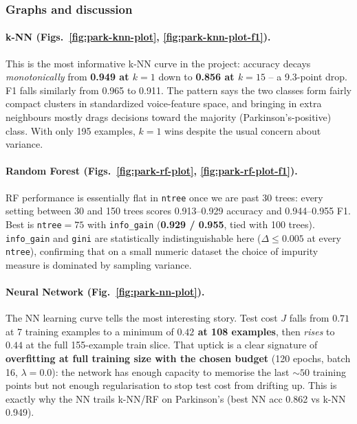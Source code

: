 \documentclass[11pt]{article}
\begin{document}
\subsubsection{Graphs and discussion}

\paragraph{k-NN (Figs.~\ref{fig:park-knn-plot}, \ref{fig:park-knn-plot-f1}).}
This is the most informative k-NN curve in the project: accuracy decays \emph{monotonically} from \textbf{0.949 at $k{=}1$} down to \textbf{0.856 at $k{=}15$} -- a 9.3-point drop. F1 falls similarly from 0.965 to 0.911. The pattern says the two classes form fairly compact clusters in standardized voice-feature space, and bringing in extra neighbours mostly drags decisions toward the majority (Parkinson's-positive) class. With only 195 examples, $k{=}1$ wins despite the usual concern about variance.

\paragraph{Random Forest (Figs.~\ref{fig:park-rf-plot}, \ref{fig:park-rf-plot-f1}).}
RF performance is essentially flat in \texttt{ntree} once we are past 30 trees: every setting between 30 and 150 trees scores 0.913--0.929 accuracy and 0.944--0.955 F1. Best is \texttt{ntree}$=75$ with \texttt{info\_gain} (\textbf{0.929 / 0.955}, tied with 100 trees). \texttt{info\_gain} and \texttt{gini} are statistically indistinguishable here ($\Delta\leq 0.005$ at every \texttt{ntree}), confirming that on a small numeric dataset the choice of impurity measure is dominated by sampling variance.

\paragraph{Neural Network (Fig.~\ref{fig:park-nn-plot}).}
The NN learning curve tells the most interesting story. Test cost $J$ falls from $0.71$ at 7 training examples to a minimum of \textbf{$0.42$ at 108 examples}, then \emph{rises} to $0.44$ at the full 155-example train slice. That uptick is a clear signature of \textbf{overfitting at full training size with the chosen budget} (120 epochs, batch 16, $\lambda{=}0.0$): the network has enough capacity to memorise the last $\sim 50$ training points but not enough regularisation to stop test cost from drifting up. This is exactly why the NN trails k-NN/RF on Parkinson's (best NN acc 0.862 vs k-NN 0.949).
\end{document}
